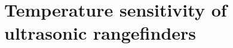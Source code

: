 
\chapter{Temperature sensitivity of ultrasonic rangefinders} \label{app:temperature}

\initial{\textcolor{red}{Pending}}
